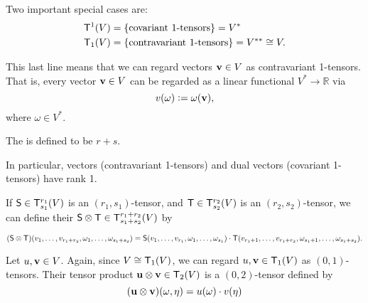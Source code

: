 Two important special cases are:
\begin{align*}
\mathsf{T}^1(V) & = \{\text{covariant $1$-tensors}\} = V^* \\
\mathsf{T}_1(V) & = \{\text{contravariant $1$-tensors}\} = V^{**} \cong V.
\end{align*}

This last line means that we can regard vectors $\mathbf{ v} \in V$ as contravariant 1-tensors.  That is, every vector $\mathbf{ v} \in V$ can be regarded as a linear functional $V^* \to \mathbb{R}$ via
$$v(\omega) := \omega(\mathbf{ v}),$$
where $\omega \in V^*$.

The  is defined to be $r+s$.

In particular, vectors (contravariant 1-tensors) and dual vectors (covariant 1-tensors) have rank 1.



\begin{df}
If $\mathsf{S} \in \mathsf{T}^{r_1}_{s_1}(V)$ is an $(r_1,s_1)$-tensor, and $\mathsf{T} \in \mathsf{T}^{r_2}_{s_2}(V)$ is an $(r_2,s_2)$-tensor, we can define their  $\mathsf{S} \otimes \mathsf{T} \in \mathsf{T}^{r_1 + r_2}_{s_1 + s_2}(V)$ by

$$(\mathsf{S}\otimes \mathsf{T})(v_1, \ldots, v_{r_1 + r_2}, \omega_1, \ldots, \omega_{s_1 + s_2}) = 
\mathsf{S}(v_1, \ldots, v_{r_1}, \omega_1, \ldots,\omega_{s_1})\cdot \mathsf{T}(v_{r_1 + 1}, \ldots, v_{r_1 + r_2}, \omega_{s_1 + 1}, \ldots, \omega_{s_1 + s_2}).$$

 
\end{df}










\begin{exa}
Let $u, \mathbf{ v} \in V$.  Again, since $V \cong \mathsf{T}_1(V)$, we can regard $u, \mathbf{ v} \in \mathsf{T}_1(V)$ as $(0,1)$-tensors.  Their tensor product $\mathbf{ u}\otimes \mathbf{ v} \in \mathsf{T}_2(V)$ is a $(0,2)$-tensor defined by
$$(\mathbf{ u}\otimes \mathbf{ v})(\omega, \eta) = u(\omega)\cdot v(\eta)$$
 
\end{exa}
 

% 
% 

